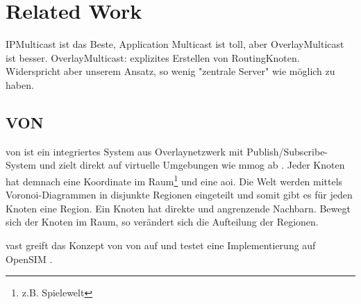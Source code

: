 \chapter{Related Work}
\label{chap:related}

IPMulticast ist das Beste, Application Multicast ist toll, aber OverlayMulticast ist besser. OverlayMulticast: explizites Erstellen von RoutingKnoten. Widerspricht aber unserem Ansatz, so wenig "zentrale Server" wie möglich zu haben.\cite{Lao2005Comparative}








\section{VON}
\label{chap:related:von}
\ac{von} ist ein integriertes System aus Overlaynetzwerk mit Publish/Subscribe-System und zielt direkt auf virtuelle Umgebungen wie \ac{mmog} ab \cite{Hu2006VON}. Jeder Knoten hat demnach eine Koordinate im Raum\footnote{z.B. Spielewelt} und eine \ac{aoi}. Die Welt werden mittels Voronoi-Diagrammen in disjunkte Regionen eingeteilt und somit gibt es für jeden Knoten eine Region. Ein Knoten hat direkte und angrenzende Nachbarn. Bewegt sich der Knoten im Raum, so verändert sich die Aufteilung der Regionen.

\ac{vast} \cite{Backhaus2007Voronoibased} greift das Konzept von \ac{von} auf und testet eine Implementierung auf OpenSIM \cite{Baumgart2007OverSim}.

